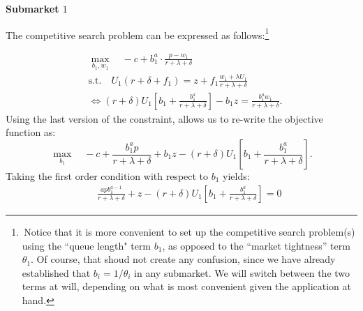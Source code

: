 \documentclass[12pt]{article} %
\theoremstyle{definition}
\begin{document}
\begin{appendix}
\medskip 

\noindent \textbf{Submarket $1$}

\medskip 

\noindent The competitive search problem can be expressed as follows:\footnote{\,Notice that it is more convenient to set up the competitive search problem(s) using the ``queue length" term $b_1$, as opposed to the ``market tightness'' term $\theta_1$. Of course, that shoud not create any confusion, since we have already established that $b_i=1/\theta_i$ in any submarket. We will switch between the two terms at will, depending on what is most convenient given the application at hand.}  

\begin{align*}
& \max_{b_1,w_1} \quad -c + b_1^a \cdot \frac{p-w_1}{r+\lambda+\delta} \\
& \text{s.t.} \quad U_1(r+\delta+f_1) = z + f_1 \frac{w_1+\lambda U_1}{r+\lambda+\delta} \\
& \iff (r+\delta) U_1 \left[b_1 + \frac{b_1^{a}}{r+\lambda+\delta}\right] - b_1 z = \frac{b_1^{a}w_1}{r+\lambda+\delta}.
\end{align*}
Using the last version of the constraint, allows us to re-write the objective function as: 
\begin{equation}
\max_{b_1} \quad -c +\frac{b_1^{a} p}{r+\lambda+\delta} + b_1 z - (r+\delta) U_{1} \left[ b_1 + \frac{b_1^{a}}{r+\lambda+\delta} \right]. \label{label01} %
\end{equation}
Taking the first order condition with respect to $b_1$ yields: 
\begin{align*}
&& \frac{a p b_1^{a-1}}{r+\lambda+\delta} + z - (r+\delta) U_1 \left[b_1 + \frac{b_1^{a}}{r+\lambda+\delta}\right] = 0 
\end{align*}


\end{appendix}
\end{document}
